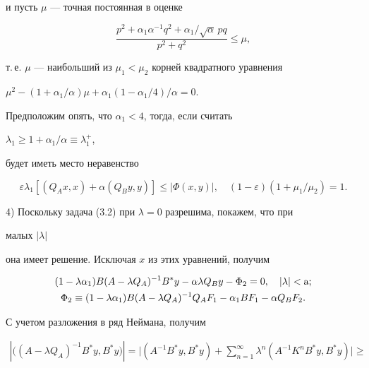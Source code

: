 \begin{pf}
и пусть $\mu$ --- точная постоянная в оценке 


$$ 


\frac{p^2+\alpha_1\alpha^{-1}q^2+\alpha_1/\sqrt{\alpha}\,p q} 


{p^2+q^2}\le\mu, 


$$ 


т.\,е. $\mu$ --- наибольший из $\mu_1{<}\mu_2$ корней квадратного уравнения 


$\mu^2-(1+\alpha_1/\alpha)\mu+\alpha_1(1-\alpha_1/4)/\alpha=0$. 


Предположим опять, что $\alpha_1<4$, тогда, если считать 


$\lambda_1\ge1+\alpha_1/\alpha\equiv\lambda^+_1$, 


будет иметь место неравенство 


\begin{equation} 


\varepsilon\lambda_1[(Q_A x,x)+\alpha(Q_B y,y)]\le 


|\Phi(x,y)|,\quad (1-\varepsilon)(1+\mu_1/\mu_2)=1. 


\end{equation} 


 


4) Поскольку задача (3.2) при $\lambda=0$ разрешима, покажем, что при 


малых $|\lambda|$ 


она имеет решение. Исключая $x$ из этих уравнений, получим 


\begin{gather} 


(1-\lambda\alpha_1)B(A-\lambda Q_A)^{-1}B^*y-\alpha\lambda 


Q_B y-\Phi_2=0,\quad |\lambda|<\A;\\ 


% 


\Phi_2\equiv(1-\lambda\alpha_1)B(A-\lambda Q_A)^{-1} 


Q_A F_1-\alpha_1B F_1-\alpha Q_B F_2.\notag 


\end{gather} 


С учетом разложения в ряд Неймана, получим 


\begin{multline*} 


|\big((A-\lambda Q_A)^{-1}B^*y,B^*y\big)|=\bigg| 


(A^{-1}B^*y,B^*y)+\sum^\infty_{n=1}\lambda^n 


(A^{-1}K^n B^*y,B^*y)\bigg|\ge \\ 



\end{multline*}
\end{pf}
